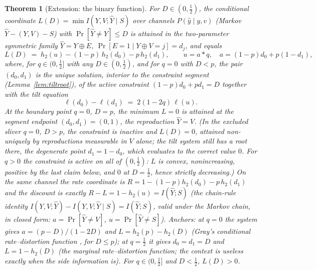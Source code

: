 ﻿\documentclass[11pt,onecolumn]{IEEEtran}
\newtheorem{theorem}{Theorem}
\newcommand{\hY}{\widehat{Y}}
\begin{document}
\begin{theorem}[Extension: the binary function]
\label{thm:binary}
For $D\in(0,\tfrac12)$, the conditional coordinate
$L(D)=\min I(Y,V;\hY\mid S)$ over channels $P(\hat y\mid y,v)$
(Markov $\hY-(Y,V)-S$) with $\Pr[\hY\ne Y]\le D$ is attained in
the two-parameter symmetric family $\hY=Y\oplus E$,
$\Pr[E=1\mid Y\oplus V=j]=d_j$, and equals
\[
L(D)\;=\;h_2(u)-(1-p)\,h_2(d_0)-p\,h_2(d_1),\qquad
u=a*q,\quad a=(1-p)d_0+p(1-d_1),
\]
where, for $q\in(0,\tfrac12]$ with any $D\in(0,\tfrac12)$, and for $q=0$
with $D<p$, the pair $(d_0,d_1)$ is the \emph{unique} solution, interior
to the constraint segment (Lemma~\ref{lem:tiltroot}), of the active
constraint $(1-p)d_0+pd_1=D$ together with the \emph{tilt equation}
\[
\ell(d_0)-\ell(d_1)\;=\;2(1-2q)\,\ell(u).
\]
At the boundary point $q=0$, $D=p$, the minimum $L=0$ is attained at
the segment endpoint $(d_0,d_1)=(0,1)$, the reproduction
$\hY=V$.
(In the excluded sliver $q=0$, $D>p$, the constraint is inactive and
$L(D)=0$, attained non-uniquely by reproductions measurable in $V$ alone; the
tilt system still has a root there, the degenerate point $d_1=1-d_0$,
which evaluates to the correct value $0$. For $q>0$ the constraint is
active on all of $(0,\tfrac12)$: $L$ is convex, nonincreasing, positive
by the last claim below, and $0$ at $D=\tfrac12$, hence strictly
decreasing.)
On the same channel the rate coordinate is $R=1-(1-p)h_2(d_0)-p\,h_2(d_1)$
and the discount is exactly $R-L=1-h_2(u)=I(\hY;S)$ (the chain-rule
identity $I(Y,V;\hY)-I(Y,V;\hY\mid S)=I(\hY;S)$, valid under the
Markov chain, in closed form: $a=\Pr[\hY\ne V]$,
$u=\Pr[\hY\ne S]$). Anchors: at $q=0$ the system gives
$a=(p-D)/(1-2D)$ and $L=h_2(p)-h_2(D)$ (Gray's conditional
rate--distortion function \cite{gray1973}, for $D\le p$); at $q=\tfrac12$
it gives $d_0=d_1=D$ and $L=1-h_2(D)$ (the marginal rate--distortion
function; the context is useless exactly when the side information is).
For $q\in(0,\tfrac12]$ and $D<\tfrac12$, $L(D)>0$.
\end{theorem}
\end{document}

